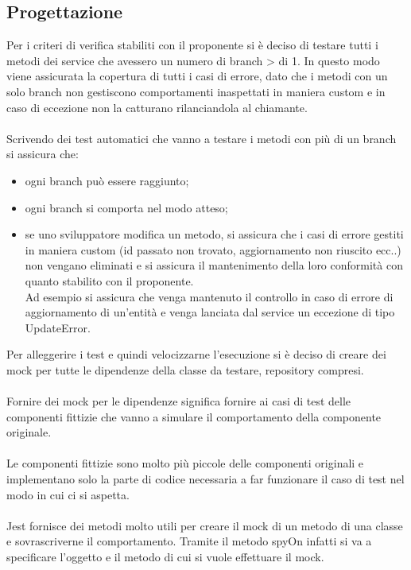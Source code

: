 \subsection{Progettazione}
Per i criteri di verifica stabiliti con il proponente si è deciso di testare tutti i metodi dei service che
avessero un numero di branch > di 1. In questo modo viene assicurata la copertura di tutti i casi di errore,
dato che i metodi con un solo branch 
non gestiscono comportamenti inaspettati in maniera custom e in caso di eccezione non la catturano 
rilanciandola al chiamante.
\\\\
Scrivendo dei test automatici che vanno a testare i metodi con più di un branch si assicura che:
\begin{itemize}
    \item ogni branch può essere raggiunto;
    \item ogni branch si comporta nel modo atteso;
    \item se uno sviluppatore modifica un metodo, si assicura che i casi di errore gestiti in maniera custom (id passato non trovato, 
    aggiornamento non riuscito ecc..) non vengano eliminati e si assicura il mantenimento della loro
    conformità con quanto stabilito con il proponente. 
    \\
    Ad esempio si assicura che venga mantenuto il controllo in caso di errore di aggiornamento di un'entità e
    venga lanciata dal service un eccezione di tipo UpdateError.
\end{itemize}
\leavevmode\newline
Per alleggerire i test e quindi velocizzarne l'esecuzione si è deciso di creare dei \gls{mock} per tutte le dipendenze
della classe da testare, repository compresi.
\\\\
Fornire dei \gls{mock} per le dipendenze significa fornire ai casi di test delle componenti fittizie che vanno a simulare
il comportamento della componente originale. 
\\\\
Le componenti fittizie sono molto più piccole delle componenti originali e implementano solo la parte di codice 
necessaria a far funzionare il caso di test nel modo in cui ci si aspetta.
\\\\
Jest fornisce dei metodi molto utili per creare il \gls{mock} di un metodo di una classe e sovrascriverne il comportamento.
Tramite il metodo spyOn infatti si va a specificare l'oggetto e il metodo di cui si vuole effettuare il \gls{mock}.
